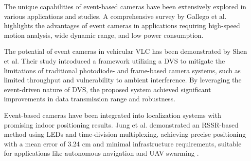 The unique capabilities of event-based cameras have been extensively explored in various applications and studies.
A comprehensive survey by Gallego et al. highlights the advantages of event cameras in
applications requiring high-speed motion analysis, wide dynamic range, and low power consumption. \cite{gallego2020event}

The potential of event cameras in vehicular \ac{VLC} has been demonstrated by Shen et al.
Their study introduced a framework utilizing a \ac{DVS} to mitigate the limitations of
traditional photodiode- and frame-based camera systems, such as limited throughput and vulnerability to ambient
interference. By leveraging the event-driven nature of DVS, the proposed system achieved significant improvements
in data transmission range and robustness. \cite{shen2019vehicular}


Event-based cameras have been integrated into localization systems with promising indoor positioning results.
Jung et al. demonstrated an \ac{RSSR}-based method using LEDs and time-division multiplexing, achieving precise positioning
with a mean error of 3.24 cm and minimal infrastructure requirements, suitable for applications like autonomous navigation
and UAV swarming \cite{jung2014rssr}.